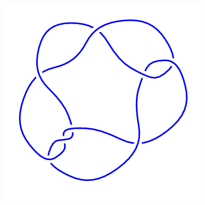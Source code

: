\begin{figure}[H]
\begin{minipage}[b]{.18\linewidth}
    \end{minipage}
    \begin{minipage}[b]{.18\linewidth}
        \centering
        \includegraphics[width=\linewidth]{../data/8_6.png}
    \end{minipage}
\end{figure}
